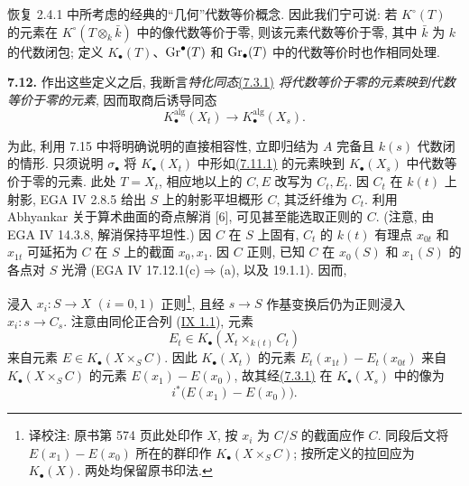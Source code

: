 恢复 2.4.1 中所考虑的经典的“几何”代数等价概念. 因此我们宁可说: 若 $K^\circ(T)$ 的元素在 $K^\circ(T\otimes_k\bar k)$ 中的像代数等价于零, 则该元素代数等价于零, 其中 $\bar k$ 为 $k$ 的代数闭包; 定义 $K_\bullet(T)$、$\operatorname{Gr}^\bullet(T)$ 和 $\operatorname{Gr}_\bullet(T)$ 中的代数等价时也作相同处理.
%
%
%
%
%

\textbf{7.12.} 作出这些定义之后, 我断言\emph{特化同态}\hyperlink{sga6.e10.eq.7-3-1}{(7.3.1)} \emph{将代数等价于零的元素映到代数等价于零的元素}, 因而取商后诱导同态
%
%
%
%
%
\begin{equation}\tag{7.12.1}
K_\bullet^{\mathrm{alg}}(X_t)
\longrightarrow K_\bullet^{\mathrm{alg}}(X_s).
\end{equation}

为此, 利用 7.15 中将明确说明的直接相容性, 立即归结为 $A$ 完备且 $k(s)$ 代数闭的情形. 只须说明 $\sigma_\bullet$ 将 $K_\bullet(X_t)$ 中形如\hyperlink{sga6.e10.eq.7-11-1}{(7.11.1)} 的元素映到 $K_\bullet(X_s)$ 中代数等价于零的元素. 此处 $T=X_t$, 相应地以上的 $C,E$ 改写为 $C_t,E_t$. 因 $C_t$ 在 $k(t)$ 上射影, EGA IV 2.8.5 给出 $S$ 上的射影平坦概形 $C$, 其泛纤维为 $C_t$. 利用 Abhyankar 关于算术曲面的奇点解消 [6], 可见甚至能选取正则的 $C$. (注意, 由 EGA IV 14.3.8, 解消保持平坦性.) 因 $C$ 在 $S$ 上固有, $C_t$ 的 $k(t)$ 有理点 $x_{0t}$ 和 $x_{1t}$ 可延拓为 $C$ 在 $S$ 上的截面 $x_0,x_1$. 因 $C$ 正则, 已知 $C$ 在 $x_0(S)$ 和 $x_1(S)$ 的各点对 $S$ 光滑 (EGA IV 17.12.1(c)$\Rightarrow$(a), 以及 19.1.1). 因而,
%
%
%
%
%
%
%
%
%
%
%
%
%

浸入 $x_i:S\to X$ $(i=0,1)$ 正则\footnote{译校注: 原书第 574 页此处印作 $X$, 按 $x_i$ 为 $C/S$ 的截面应作 $C$. 同段后文将 $E(x_1)-E(x_0)$ 所在的群印作 $K_\bullet(X\times_SC)$; 按所定义的拉回应为 $K_\bullet(X)$. 两处均保留原书印法.}, 且经 $s\to S$ 作基变换后仍为正则浸入 $x_i:s\to C_s$. 注意由同伦正合列 (\hyperlink{sga6.e09.prop.1-1}{IX 1.1}), 元素
%
%
\[
E_t\in K_\bullet(X_t\times_{k(t)}C_t)
\]
来自元素 $E\in K_\bullet(X\times_SC)$. 因此 $K_\bullet(X_t)$ 的元素 $E_t(x_{1t})-E_t(x_{0t})$ 来自 $K_\bullet(X\times_SC)$ 的元素 $E(x_1)-E(x_0)$, 故其经\hyperlink{sga6.e10.eq.7-3-1}{(7.3.1)} 在 $K_\bullet(X_s)$ 中的像为
%
%
%
\[
i^*\bigl(E(x_1)-E(x_0)\bigr).
\tag{*}
\]


